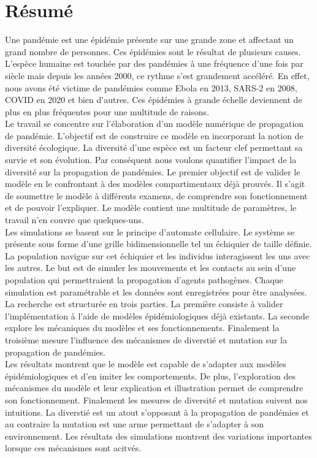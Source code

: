 \chapter{Résumé} \label{ch:resume}

Une pandémie est une épidémie présente sur une grande zone et affectant un grand nombre de personnes. Ces épidémies sont le résultat de plusieurs causes. L'espèce humaine est touchée par des pandémies à une fréquence d'une fois par siècle mais depuis les années 2000, ce rythme s'est grandement accéléré. En effet, nous avons été victime de pandémies comme Ebola en 2013, SARS-2 en 2008, COVID en 2020 et bien d'autres. Ces épidémies à grande échelle deviennent de plus en plus fréquentes pour une multitude de raisons.\\

Le travail se concentre sur l'élaboration d'un modèle numérique de propagation de pandémie. L'objectif est de construire ce modèle en incorporant la notion de diversité écologique. La diversité d'une espèce est un facteur clef permettant sa survie et son évolution. Par conséquent nous voulons quantifier l'impact de la diversité sur la propagation de pandémies. Le premier objectif est de valider le modèle en le confrontant à des modèles compartimentaux déjà prouvés. Il s'agit de soumettre le modèle à différents examens, de comprendre son fonctionnement et de pouvoir l'expliquer. Le modèle contient une multitude de paramètres, le travail n'en couvre que quelques-uns.\\

Les simulations se basent sur le principe d'automate cellulaire. Le système se présente sous forme d'une grille bidimensionnelle tel un échiquier de taille définie. La population navigue sur cet échiquier et les individus interagissent les uns avec les autres. Le but est de simuler les mouvements et les contacts au sein d'une population qui permettraient la propagation d'agents pathogènes. Chaque simulation est paramétrable et les données sont enregistrées pour être analysées.\\

La recherche est structurée en trois parties. La première consiste à valider l'implémentation à l'aide de modèles épidémiologiques déjà existants. La seconde explore les mécaniques du modèles et ses fonctionnements. Finalement la troisième mesure l'influence des mécanismes de diverstié et mutation sur la propagation de pandémies.\\

Les résultats montrent que le modèle est capable de s'adapter aux modèles épidémiologiques et d'en imiter les comportements. De plus, l'exploration des mécanismes du modèle et leur explication et illustration permet de comprendre son fonctionnement. Finalement les mesures de diversité et mutation suivent nos intuitions. La diverstié est un atout s'opposant à la propagation de pandémies et au contraire la mutation est une arme permettant de s'adapter à son environnement. Les résultats des simulations montrent des variations importantes lorsque ces mécanismes sont acitvés.